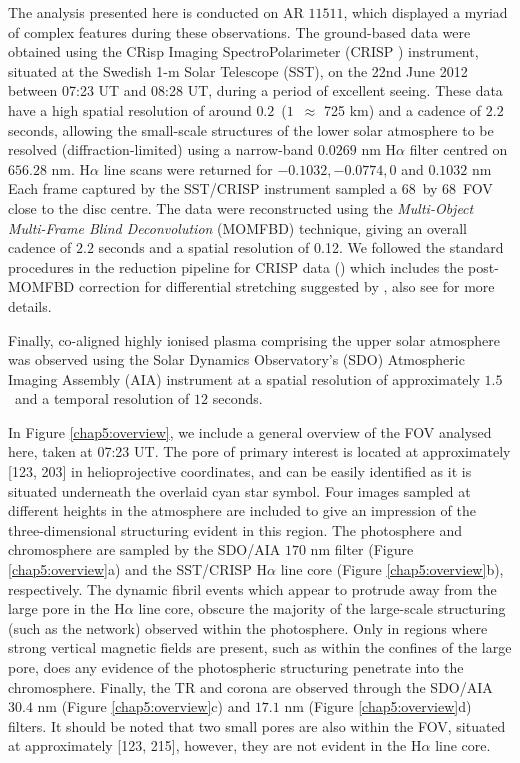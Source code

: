 	The analysis presented here is conducted on AR $11511$, which displayed a myriad of complex features during these observations.
	The ground-based data were obtained using the CRisp Imaging SpectroPolarimeter (CRISP \citealt{Scharmer2008}) instrument, situated at the Swedish 1-m Solar Telescope (SST), on the 22nd June 2012 between 07:23 UT and 08:28 UT, during a period of excellent seeing.
	These data have a high spatial resolution of around $0.2$\arcsecs\ ($1$\arcsecs\ $\approx$ 725 km) and a cadence of $2.2$ seconds, allowing the small-scale structures of the lower solar atmosphere to be resolved (diffraction-limited) using a narrow-band $0.0269$ nm H$\alpha$ filter centred on $656.28$ nm.
	H$\alpha$ line scans were returned for $-0.1032, -0.0774, 0$ and $0.1032$ nm
	Each frame captured by the SST/CRISP instrument sampled a $68$\arcsecs\ by $68$\arcsecs\ FOV close to the disc centre.
	The data were reconstructed using the {\it Multi-Object Multi-Frame Blind Deconvolution} (MOMFBD) technique, giving an overall cadence of $2.2$ seconds and a spatial resolution of 0.12\arcsecs\citep{Noort2005}.
	We followed the standard procedures in the reduction pipeline for CRISP data (\citet{2015A&A...573A..40D}) which includes the post-MOMFBD correction for differential stretching suggested by \citet{2012A&A...548A.114H}, also see \citet{2013ApJ...769...44S} for more details.

	Finally, co-aligned highly ionised plasma comprising the upper solar atmosphere was observed using the Solar Dynamics Observatory's (SDO) Atmospheric Imaging Assembly (AIA) instrument at a spatial resolution of approximately $1.5$\arcsecs\ and a temporal resolution of $12$ seconds.

	In Figure \ref{chap5:overview}, we include a general overview of the FOV analysed here, taken at 07:23 UT.
	The pore of primary interest is located at approximately [123\arcsecs, 203\arcsecs] in helioprojective coordinates, and can be easily identified as it is situated underneath the overlaid cyan star symbol.
	Four images sampled at different heights in the atmosphere are included to give an impression of the three-dimensional structuring evident in this region.
	The photosphere and chromosphere are sampled by the SDO/AIA $170$ nm filter (Figure \ref{chap5:overview}a) and the SST/CRISP H$\alpha$ line core (Figure \ref{chap5:overview}b), respectively.
	The dynamic fibril events which appear to protrude away from the large pore in the H$\alpha$ line core, obscure the majority of the large-scale structuring (such as the network) observed within the photosphere.
	Only in regions where strong vertical magnetic fields are present, such as within the confines of the large pore, does any evidence of the photospheric structuring penetrate into the chromosphere.
	Finally, the TR and corona are observed through the SDO/AIA $30.4$ nm (Figure \ref{chap5:overview}c) and $17.1$ nm (Figure \ref{chap5:overview}d) filters.
	It should be noted that two small pores are also within the FOV, situated at approximately  [123\arcsecs, 215\arcsecs], however, they are not evident in the H$\alpha$ line core.

